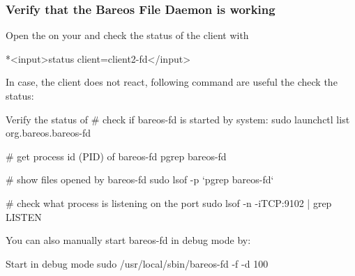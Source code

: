 % 
% 

% 


\subsubsection{Verify that the Bareos File Daemon is working}

Open the  on your \bareosDir and check the status of the client with

\begin{bconfig}{}
*<input>status client=client2-fd</input>
\end{bconfig}

In case, the client does not react, following command are useful the check the status:


\begin{commands}{Verify the status of \bareosFd}
# check if bareos-fd is started by system:
sudo launchctl list org.bareos.bareos-fd

# get process id (PID) of bareos-fd
pgrep bareos-fd

# show files opened by bareos-fd
sudo lsof -p `pgrep bareos-fd`

# check what process is listening on the \bareosFd port
sudo lsof -n -iTCP:9102 | grep LISTEN
\end{commands}

You can also manually start bareos-fd in debug mode by:

\begin{commands}{Start \bareosFd in debug mode}
sudo /usr/local/sbin/bareos-fd -f -d 100
\end{commands}
